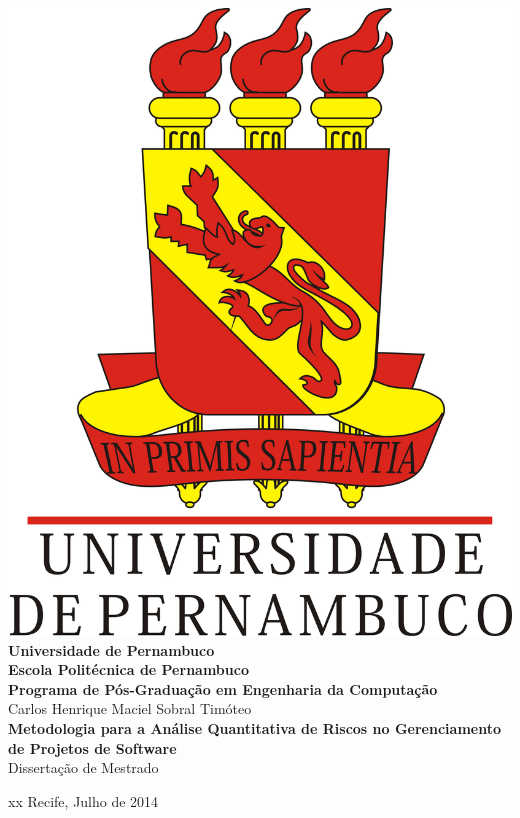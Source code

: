 \begin{titlepage}

  \begin{center}
  \includegraphics[scale=0.17]{image/UPE_brasao}\\
	\textbf{Universidade de Pernambuco}\\
	\textbf{Escola Politécnica de Pernambuco}\\
    \textbf{Programa de Pós-Graduação em Engenharia da Computação}\\[3cm]

    Carlos Henrique Maciel Sobral Timóteo\\[2cm]


    {\large \textbf{Metodologia para a Análise Quantitativa de Riscos no Gerenciamento de Projetos de Software}}\\[3cm]

    Dissertação de Mestrado\\[2cm]
  \end{center}


\begin{center}
  {\color{white} xx}\vfill
  Recife, Julho de 2014
\end{center}

\end{titlepage}

